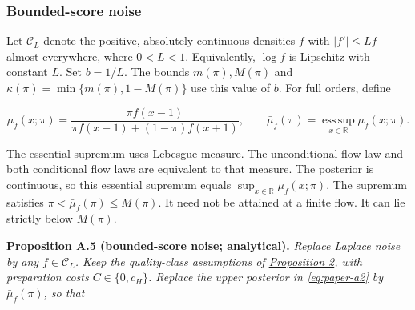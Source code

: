 
\subsubsection{Bounded-score noise}\label{logistic-noise}

Let \(\mathcal C_L\) denote the positive, absolutely continuous densities
\(f\) with \(|f'|\le Lf\) almost everywhere, where \(0<L<1\).
Equivalently, \(\log f\) is Lipschitz with constant \(L\).
Set \(b=1/L\).
The bounds \(m(\pi),M(\pi)\) and
\(\kappa(\pi)=\min\{m(\pi),1-M(\pi)\}\) use this value of \(b\).
For full orders, define

\[
\mu_f(x;\pi)=
\frac{\pi f(x-1)}{\pi f(x-1)+(1-\pi)f(x+1)},\qquad
\bar\mu_f(\pi)=\operatorname*{ess\,sup}_{x\in\mathbb R}\mu_f(x;\pi).
\]

The essential supremum uses Lebesgue measure.
The unconditional flow law and both conditional flow laws are equivalent to that measure.
The posterior is continuous, so this essential supremum equals \(\sup_{x\in\mathbb R}\mu_f(x;\pi)\).
The supremum satisfies \(\pi<\bar\mu_f(\pi)\le M(\pi)\).
It need not be attained at a finite flow.
It can lie strictly below \(M(\pi)\).


\protect{}\label{result-proposition-a-5}{\textbf{Proposition
A.5 (bounded-score noise; analytical).}} \emph{Replace Laplace noise by
any \(f\in\mathcal C_L\).
Keep the quality-class assumptions of
\hyperref[result-proposition-2]{Proposition 2}, with preparation costs
\(C\in\{0,c_H\}\).
Replace the upper posterior in \eqref{eq:paper-a2} by \(\bar\mu_f(\pi)\), so that}

